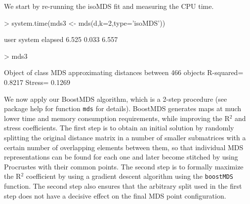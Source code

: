 \documentclass[a4paper,12pt,nogin]{article}
\newcommand{\newtext}[1]{{\color{blue} #1}} %
\begin{document}
\newtext{We start by re-running the isoMDS fit and measuring the CPU time.}

\footnotesize
\begin{Schunk}
\begin{Sinput}
> system.time(mds3 <- mds(d,k=2,type='isoMDS'))
\end{Sinput}
\begin{Soutput}
   user  system elapsed 
  6.525   0.033   6.557 
\end{Soutput}
\begin{Sinput}
> mds3
\end{Sinput}
\begin{Soutput}
Object of class MDS approximating distances between 466 objects 
R-squared= 0.8217 Stress= 0.1269 
\end{Soutput}
\end{Schunk}
\normalsize

\newtext{We now apply our BoostMDS algorithm, which is a 2-step procedure}
(see package help for function \texttt{mds} for details).
\newtext{BoostMDS} 
generates maps at much lower time and memory consumption requirements, 
\newtext{while improving the R$^2$ and stress coefficients}.
\newtext{The first step is to obtain an initial solution by} randomly splitting the original distance matrix in a number of smaller submatrices with a certain number of overlapping elements between them, so that individual MDS representations can be found for each one and later become stitched by using Procrustes with their common points. 
\newtext{The second step is to formally maximize the R$^2$ coefficient by using a gradient descent algorithm using the \texttt{boostMDS} function. The second step also ensures that the arbitrary split used in the first step does not have}
a decisive effect
on the final MDS point configuration.
\end{document}

